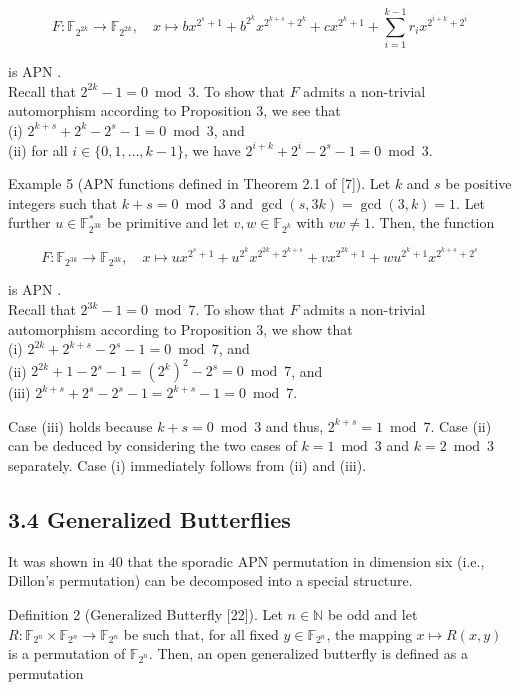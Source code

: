 \documentclass[10pt]{article}
\begin{document}
$$
F: \mathbb{F}_{2^{2 k}} \rightarrow \mathbb{F}_{2^{2 k}}, \quad x \mapsto b x^{2^{s}+1}+b^{2^{k}} x^{2^{k+s}+2^{k}}+c x^{2^{k}+1}+\sum_{i=1}^{k-1} r_{i} x^{2^{i+k}+2^{i}}
$$

is APN .\\
Recall that $2^{2 k}-1=0 \bmod 3$. To show that $F$ admits a non-trivial automorphism according to Proposition 3, we see that\\
(i) $2^{k+s}+2^{k}-2^{s}-1=0 \bmod 3$, and\\
(ii) for all $i \in\{0,1, \ldots, k-1\}$, we have $2^{i+k}+2^{i}-2^{s}-1=0 \bmod 3$.

Example 5 (APN functions defined in Theorem 2.1 of [7]). Let $k$ and $s$ be positive integers such that $k+s=0 \bmod 3$ and $\operatorname{gcd}(s, 3 k)=\operatorname{gcd}(3, k)=1$. Let further $u \in \mathbb{F}_{2^{3 k}}^{*}$ be primitive and let $v, w \in \mathbb{F}_{2^{k}}$ with $v w \neq 1$. Then, the function

$$
F: \mathbb{F}_{2^{3 k}} \rightarrow \mathbb{F}_{2^{3 k}}, \quad x \mapsto u x^{2^{s}+1}+u^{2^{k}} x^{2^{2 k}+2^{k+s}}+v x^{2^{2 k}+1}+w u^{2^{k}+1} x^{2^{k+s}+2^{s}}
$$

is APN .\\
Recall that $2^{3 k}-1=0 \bmod 7$. To show that $F$ admits a non-trivial automorphism according to Proposition 3, we show that\\
(i) $2^{2 k}+2^{k+s}-2^{s}-1=0 \bmod 7$, and\\
(ii) $2^{2 k}+1-2^{s}-1=\left(2^{k}\right)^{2}-2^{s}=0 \bmod 7$, and\\
(iii) $2^{k+s}+2^{s}-2^{s}-1=2^{k+s}-1=0 \bmod 7$.

Case (iii) holds because $k+s=0 \bmod 3$ and thus, $2^{k+s}=1 \bmod 7$. Case (ii) can be deduced by considering the two cases of $k=1 \bmod 3$ and $k=2 \bmod 3$ separately. Case (i) immediately follows from (ii) and (iii).

\subsection*{3.4 Generalized Butterflies}
It was shown in 40 that the sporadic APN permutation in dimension six (i.e., Dillon's permutation) can be decomposed into a special structure.

Definition 2 (Generalized Butterfly [22]). Let $n \in \mathbb{N}$ be odd and let $R: \mathbb{F}_{2^{n}} \times \mathbb{F}_{2^{n}} \rightarrow \mathbb{F}_{2^{n}}$ be such that, for all fixed $y \in \mathbb{F}_{2^{n}}$, the mapping $x \mapsto R(x, y)$ is a permutation of $\mathbb{F}_{2^{n}}$. Then, an open generalized butterfly is defined as a permutation
\end{document}
